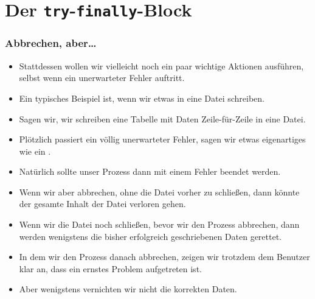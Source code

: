 \documentclass[aspectratio=169,mathserif,notheorems]{beamer}%
\begin{document}
\section{Der \texttt{try}-\texttt{finally}-Block}%
%
\begin{frame}[t]%
\frametitle{Abbrechen, aber\dots}%
\begin{itemize}%
%
%
%
%
%
%
%
%
%
%
%
%
%
\item<7-> Stattdessen wollen wir vielleicht noch ein paar wichtige Aktionen ausführen, selbst wenn ein unerwarteter Fehler auftritt.%
%
\item<8-> Ein typisches Beispiel ist, wenn wir etwas in eine Datei schreiben.%
%
\item<9-> Sagen wir, wir schreiben eine Tabelle mit Daten Zeile-für-Zeile in eine Datei.%
%
\item<10-> Plötzlich passiert ein völlig unerwarteter Fehler, sagen wir etwas eigenartiges wie ein .%
%
\item<11-> Natürlich sollte unser Prozess dann mit einem Fehler beendet werden.%
%
\item<12-> Wenn wir aber abbrechen, ohne die Datei vorher zu schließen, dann könnte der gesamte Inhalt der Datei verloren gehen.%
%
\item<13-> Wenn wir die Datei noch schließen, bevor wir den Prozess abbrechen, dann werden wenigstens die bisher erfolgreich geschriebenen Daten gerettet.%
%
\item<14-> In dem wir den Prozess danach abbrechen, zeigen wir trotzdem dem Benutzer klar an, dass ein ernstes Problem aufgetreten ist.%
%
\item<15-> Aber wenigstens vernichten wir nicht die korrekten Daten.%
%
\end{itemize}%
\end{frame}%
\end{document}
